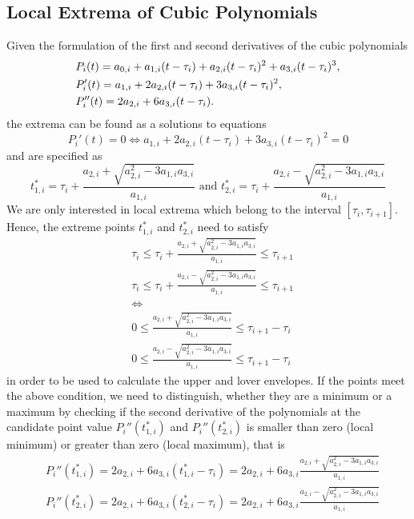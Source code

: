 \documentclass[article,moreauthors,pdftex,10pt,a4paper]{ssrn}
\begin{document}
\subsection{Local Extrema of Cubic Polynomials}
Given the formulation of the first and second derivatives of the cubic polynomials
\begin{align*}
& P_i(t) = a_{0,i} + a_{1,i} (t - \tau_i)  + a_{2,i} (t - \tau_i)^2 + a_{3,i} (t -\tau_i)^3,  \\\notag
& P_i'(t) = a_{1,i}   + 2a_{2,i} (t - \tau_i) + 3a_{3,i} (t -\tau_i)^2, \\
& P_i''(t) = 2 a_{2,i}  + 6a_{3,i} (t -\tau_i).
\end{align*}
the extrema can be found as a solutions to equations
\begin{equation}
P_i'(t) =  0 \Longleftrightarrow a_{1,i}   + 2a_{2,i} (t - \tau_i) + 3a_{3,i} (t -\tau_i)^2 = 0 
\end{equation}
and are specified as
\begin{equation}
t^*_{1,i} = \tau_i + \frac{a_{2,i}   + \sqrt{  a_{2,i}^2 - 3 a_{1,i} a_{3,i}   }     }{a_{1,i}} \text{ and } t^*_{2,i} = \tau_i + \frac{a_{2,i}   -  \sqrt{  a_{2,i}^2 - 3 a_{1,i} a_{3,i}  }     }{a_{1,i}}
\end{equation}
We are only interested in local extrema which belong to the interval $[\tau_i, \tau_{i+1}]$. Hence, the extreme points $t^*_{1,i} $ and $t^*_{2,i} $ need to satisfy 
\begin{align*}
& \tau_i \leq \tau_i + \frac{a_{2,i}   + \sqrt{  a_{2,i}^2 - 3 a_{1,i} a_{3,i}   }     }{a_{1,i}} \leq \tau_{i+1} \\
& \tau_i \leq \tau_i + \frac{a_{2,i}   -  \sqrt{  a_{2,i}^2 - 3 a_{1,i} a_{3,i}  }     }{a_{1,i}} \leq \tau_{i+1} \\
& \Longleftrightarrow \\
& 0 \leq  \frac{a_{2,i}   + \sqrt{  a_{2,i}^2 - 3 a_{1,i} a_{3,i}   }     }{a_{1,i}} \leq \tau_{i+1} - \tau_i \\
& 0 \leq  \frac{a_{2,i}   -  \sqrt{  a_{2,i}^2 - 3 a_{1,i} a_{3,i}  }     }{a_{1,i}} \leq \tau_{i+1} -\tau_i 
\end{align*}
in order to be used to calculate the upper and lover envelopes. If the points meet the above condition, we need to distinguish, whether they are a minimum or a maximum by checking if the second derivative of the polynomials at the candidate point value $P_i''(t^*_{1,i})$ and $P_i''(t^*_{2,i})$ is smaller than zero (local minimum) or greater than zero (local maximum), that is
\begin{align*}
& P_i''(t^*_{1,i}) =  2 a_{2,i}  + 6a_{3,i} (t^*_{1,i} -\tau_i) =  2 a_{2,i}  + 6a_{3,i} \frac{  a_{2,i}   + \sqrt{  a_{2,i}^2 - 3 a_{1,i} a_{3,i}   }} {a_{1,i}}\\
& P_i''(t^*_{2,i}) =  2 a_{2,i}  + 6a_{3,i} (t^*_{2,i} -\tau_i) =  2 a_{2,i}  + 6a_{3,i} \frac{  a_{2,i}   - \sqrt{  a_{2,i}^2 - 3 a_{1,i} a_{3,i}   }} {a_{1,i}}
\end{align*}
\end{document}
